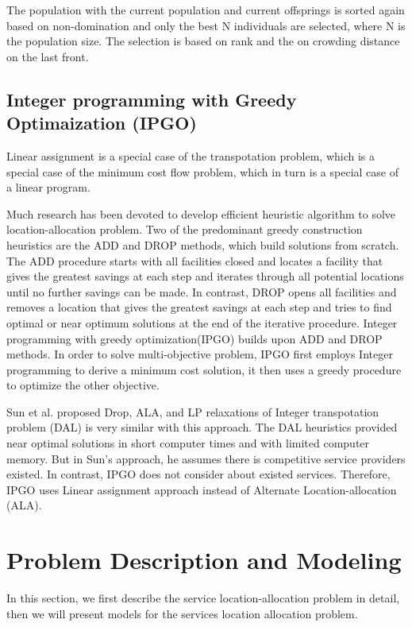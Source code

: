 \documentclass{llncs}
\begin{document}
The population with the current population and current offsprings is sorted again based on non-domination and only the best N individuals are selected, where N is the population size.
The selection is based on rank and the on crowding distance on the last front.

\subsection{Integer programming with Greedy Optimaization (IPGO)}

Linear assignment \cite{lawler1963quadratic} is a special case of the transpotation problem, which is a special case of the minimum cost flow problem, which
in turn is a special case of a linear program.

Much research has been devoted to develop efficient heuristic algorithm to solve location-allocation problem. Two of the predominant
greedy construction heuristics are the ADD and DROP \cite{Sun} methods, which build solutions from scratch. 
The ADD procedure starts with all facilities closed and locates a facility that gives the greatest savings at each step and 
iterates through all potential locations until no further savings can be made. In contrast, DROP opens all facilities and removes a 
location that gives the greatest savings at each step and tries to find optimal or near optimum solutions at the end of the 
iterative procedure. Integer programming with greedy optimization(IPGO) builds upon ADD and DROP methods. 
In order to solve multi-objective problem, IPGO first employs Integer programming to derive a minimum cost solution, it then 
uses a greedy procedure to optimize the other objective.

Sun et al. proposed Drop, ALA, and LP relaxations of Integer transpotation problem (DAL) \cite{Sun} is very similar with this approach. 
The DAL heuristics provided near optimal solutions in short computer times and with limited computer memory. But in Sun's approach, 
he assumes there is competitive service providers existed. In contrast, IPGO does not consider about existed services. Therefore, IPGO
uses Linear assignment approach instead of Alternate Location-allocation (ALA).



\section{Problem Description and Modeling}
\label{sec:problem}
In this section, we first describe the service location-allocation problem in detail, then we will present models for the services location allocation problem.
\end{document}
